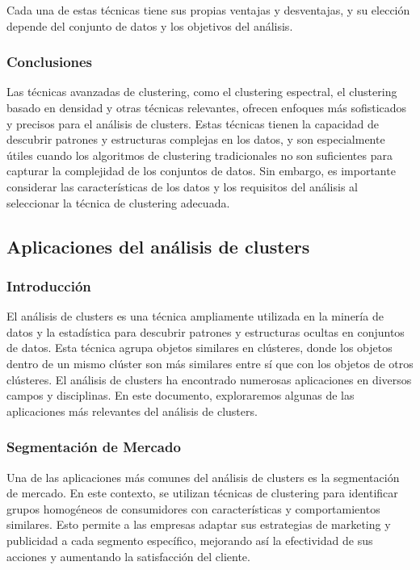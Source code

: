 \documentclass{article}
\begin{document}
Cada una de estas técnicas tiene sus propias ventajas y desventajas, y su elección depende del conjunto de datos y los objetivos del análisis.

\subsubsection*{Conclusiones}
Las técnicas avanzadas de clustering, como el clustering espectral, el clustering basado en densidad y otras técnicas relevantes, ofrecen enfoques más sofisticados y precisos para el análisis de clusters. Estas técnicas tienen la capacidad de descubrir patrones y estructuras complejas en los datos, y son especialmente útiles cuando los algoritmos de clustering tradicionales no son suficientes para capturar la complejidad de los conjuntos de datos. Sin embargo, es importante considerar las características de los datos y los requisitos del análisis al seleccionar la técnica de clustering adecuada.

\subsection{Aplicaciones del análisis de clusters}

\subsubsection{Introducción}
El análisis de clusters es una técnica ampliamente utilizada en la minería de datos y la estadística para descubrir patrones y estructuras ocultas en conjuntos de datos. Esta técnica agrupa objetos similares en clústeres, donde los objetos dentro de un mismo clúster son más similares entre sí que con los objetos de otros clústeres. El análisis de clusters ha encontrado numerosas aplicaciones en diversos campos y disciplinas. En este documento, exploraremos algunas de las aplicaciones más relevantes del análisis de clusters.

\subsubsection{Segmentación de Mercado}
Una de las aplicaciones más comunes del análisis de clusters es la segmentación de mercado. En este contexto, se utilizan técnicas de clustering para identificar grupos homogéneos de consumidores con características y comportamientos similares. Esto permite a las empresas adaptar sus estrategias de marketing y publicidad a cada segmento específico, mejorando así la efectividad de sus acciones y aumentando la satisfacción del cliente.
\end{document}
